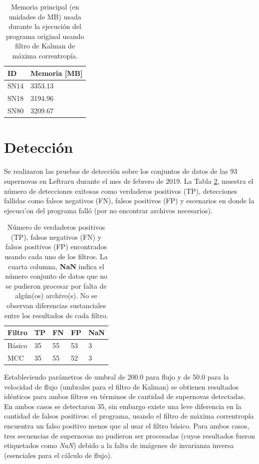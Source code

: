 \begin{table}[h!]
\centering
\caption{Memoria principal (en unidades de MB) usada durante la ejecuci\'on del programa original usando filtro de Kalman de m\'axima correntrop\'ia.}
\begin{tabular}{|l|l|}
\hline
\textbf{ID} & Memoria [MB]\\\hline\hline
SN14 & 3353.13\\\hline
SN18 & 3194.96\\\hline
SN80 & 3209.67\\\hline
\end{tabular}
\label{tab:mem2}
\end{table}

\section{Detecci\'on}
Se realizaron las pruebas de detecci\'on sobre los conjuntos de datos de las 93 supernovas en Leftraru durante el mes de febrero de 2019. La Tabla \ref{tab:tpfn}, muestra el n\'umero de detecciones exitosas como verdaderos positivos (TP), detecciones fallidas como falsos negativos (FN), falsos positivos (FP) y escenarios en donde la ejecuc\i'on del programa fall\'o (por no encontrar archivos necesarios). 
\bigskip

\begin{table}[h!]
\centering
\caption{N\'umero de verdaderos positivos (TP), falsos negativos (FN) y falsos positivos (FP) encontrados usando cada uno de los filtros. La cuarta columna, \textbf{NaN} indica el n\'umero conjunto de datos que no se pudieron procesar por falta de alg\'un(os) archivo(s). No se observan diferencias sustanciales entre los resultados de cada filtro.}
\begin{tabular}{|l|l|l|l|l|}
\hline
\textbf{Filtro} & \textbf{TP} & \textbf{FN} & \textbf{FP}  & \textbf{NaN}\\ \hline
Básico          & 35          & 55         & 53 & 3 \\ \hline
MCC             & 35          & 55         & 52 & 3 \\ \hline
\end{tabular}
\label{tab:tpfn}
\end{table}

Estableciendo par\'ametros de umbral de 200.0 para flujo y de 50.0 para la velocidad de flujo (umbrales para el filtro de Kalman) se obtienen resultados id\'enticos para ambos filtros en t\'erminos de cantidad de supernovas detectadas. En ambos casos se detectaron 35, sin embargo existe una leve diferencia en la cantidad de falsos positivos: el programa, usando el filtro de m\'axima correntrop\'ia encuentra un falso positivo menos que al usar el filtro b\'asico. Para ambos casos, tres secuencias de supernovas no pudieron ser procesadas (cuyos resultados fueron etiquetados como \textit{NaN}) debido a la falta de im\'agenes de invarianza inversa (esenciales para el c\'alculo de flujo).  %
\bigskip

